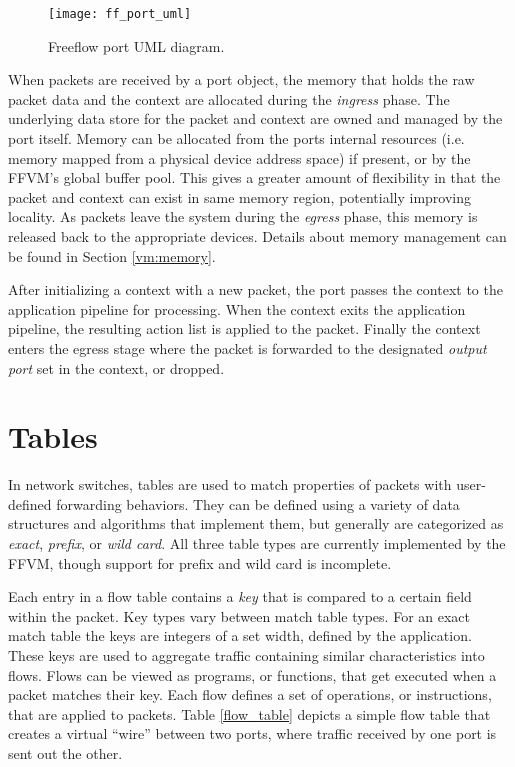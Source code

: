\begin{figure}[h]
\centering
\texttt{[image: ff\_port\_uml]}
\caption{Freeflow port UML diagram.}
\label{port_uml}
\end{figure}

When packets are received by a port object, the memory that holds the raw
packet data and the context are allocated during the \emph{ingress} phase. The
underlying data store for the packet and context are owned and managed by the
port itself. Memory can be allocated from the ports internal resources (i.e.
memory mapped from a physical device address space) if present, or by the FFVM's
global buffer pool. This gives a greater amount of flexibility in that the
packet and context can exist in same memory region, potentially improving
locality. As packets leave the system during the \emph{egress} phase, this
memory is released back to the appropriate devices. Details about memory
management can be found in Section \ref{vm:memory}.

After initializing a context with a new packet, the port passes the context to
the application pipeline for processing. When the context exits the application
pipeline, the resulting action list is applied to the packet. Finally the
context enters the egress stage where the packet is forwarded to the designated
\emph{output port} set in the context, or dropped.


\section{Tables}
\label{vm:tables}
In network switches, tables are used to match properties of packets
with user-defined forwarding behaviors. They can be defined using a variety of
data structures and algorithms that implement them, but generally are categorized
as \emph{exact}, \emph{prefix}, or \emph{wild card}. All three table types are
currently implemented by the FFVM, though support for prefix and wild card is
incomplete.

Each entry in a flow table contains a \emph{key} that is compared to a
certain field within the packet. Key types vary between match table types. For an
exact match table the keys are integers of a set width, defined by the
application. These keys are used to aggregate traffic containing similar
characteristics into flows. Flows can be viewed as programs, or functions,
that get executed when a packet matches their key. Each flow defines a
set of operations, or instructions, that are applied to packets. Table
\ref{flow_table} depicts a simple flow table that creates a virtual ``wire''
between two ports, where traffic received by one port is sent out the other.

